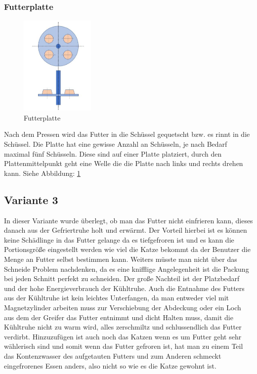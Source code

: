 \newpage
\subsubsection{Futterplatte}

\begin{figure}
\vspace{-30pt}
  \begin{center}
    \includegraphics[width=0.32\textwidth]{Bilder/Powerpoint/Futterplatte}
  \end{center}
  \caption{Futterplatte}
  \label{Futterplatte}
  \vspace{-20pt}
\end{figure}


Nach dem Pressen wird das Futter in die Schüssel gequetscht bzw. es rinnt in die Schüssel. Die Platte hat eine gewisse Anzahl an Schüsseln, je nach Bedarf maximal fünf Schüsseln. Diese sind auf einer Platte platziert, durch den Plattenmittelpunkt geht eine Welle die die Platte nach links und rechts drehen kann. Siehe Abbildung: \ref{Futterplatte}



\subsection{Variante 3}

In dieser Variante wurde überlegt, ob man das Futter nicht einfrieren kann, dieses danach aus der Gefriertruhe holt und erwärmt. Der Vorteil hierbei ist es können keine Schädlinge in das Futter gelange da es tiefgefroren ist und es kann die Portionsgröße eingestellt werden wie viel die Katze bekommt da der Benutzer die Menge an Futter selbst bestimmen kann.  Weiters müsste man nicht über das Schneide Problem nachdenken, da es eine knifflige Angelegenheit ist die Packung bei jeden Schnitt perfekt zu schneiden. Der große Nachteil ist der Platzbedarf und der hohe Energieverbrauch der Kühltruhe. Auch die Entnahme des Futters aus der Kühltruhe ist kein leichtes Unterfangen, da man entweder viel mit Magnetzylinder arbeiten muss zur Verschiebung der Abdeckung oder ein Loch aus dem der Greifer das Futter entnimmt und dicht Halten muss, damit die Kühltruhe nicht zu warm wird, alles zerschmiltz und schlussendlich das Futter verdirbt. Hinzuzufügen ist auch noch das Katzen wenn es um Futter geht sehr wählerisch sind und somit wenn das Futter gefroren ist, hat man zu einem  Teil das Kontenzwasser des aufgetauten Futters und zum Anderen schmeckt eingefrorenes Essen anders, also nicht so wie es die Katze gewohnt ist.

